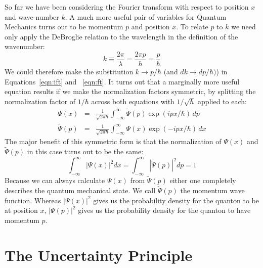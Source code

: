 \documentclass[12pt]{article}
\begin{document}
So far we have been considering the Fourier transform with respect to position $x$ and wave-number $k$.  A much more useful pair of variables for Quantum Mechanics turns out to be momentum $p$ and position $x$.  To relate $p$ to $k$ we need only apply the DeBroglie relation to the wavelength in the definition of the wavenumber:
\begin{displaymath}
k \equiv \frac{2 \pi}{\lambda} = \frac{2 \pi p}{h} = \frac{p}{\hbar}
\end{displaymath}
We could therefore make the substitution $k \to p/\hbar$ (and $dk \to dp / \hbar)$) in Equations~\ref{eqn:ift} and ~\ref{eqn:ft}.  It turns out that a marginally more useful equation results if we make the normalization factors symmetric, by splitting the normalization factor of $1/\hbar$ across both equations with $1/\sqrt{\hbar}$ applied to each:
\begin{eqnarray} 
\Psi(x) &=& \frac{1}{\sqrt{2\pi\hbar}} \int_{-\infty}^{\infty} \widetilde{\Psi}(p) \exp(ipx/\hbar) \, dp \\
\widetilde{\Psi}(p) &=&  \frac{1}{\sqrt{2\pi\hbar}} \int_{-\infty}^{\infty} {\Psi}(x) \exp(-ipx/\hbar) \, dx
\end{eqnarray}
The major benefit of this symmetric form is that the normalization of $\Psi(x)$ and $\widetilde{\Psi}(p)$ in this case turns out to be the same:
\begin{displaymath}
\int_{-\infty}^{\infty} |\Psi(x)|^2 dx = \int_{-\infty}^{\infty} |\widetilde{\Psi}(p)|^2 dp = 1 
\end{displaymath}
Because we can always calculate $\Psi(x)$ from $\widetilde{\Psi}(p)$ either one completely describes the quantum mechanical state.  We call $\widetilde{\Psi}(p)$ the momentum wave function.   Whereas $|\Psi(x)|^2$ gives us the probability density for the quanton to be at position $x$, $|\Psi(p)|^2$ gives us the probability density for the quanton to have momentum $p$.

\section{The Uncertainty Principle}
\end{document}
